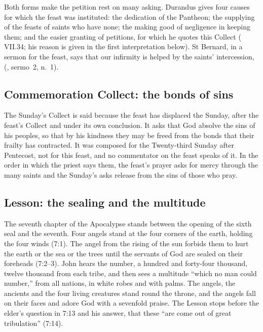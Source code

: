 Both forms make the petition rest on many asking. Durandus gives four causes
for which the feast was instituted: the dedication of the Pantheon; the
supplying of the feasts of saints who have none; the making good of
negligence in keeping them; and the easier granting of petitions, for which
he quotes this Collect ( VII.34; his reason is given in the
first interpretation below). St Bernard, in a sermon for the feast, says that our infirmity is helped by the saints'
intercession, 
(, sermo~2, n.~1).

\subsection{Commemoration Collect: the bonds of sins}
\label{sec:element-commemoration-collect}

The Sunday's Collect is said because the feast has displaced the Sunday, after
the feast's Collect and under its own conclusion. It asks that God absolve the
sins of his peoples, so that by his kindness they may be freed from the bonds
that their frailty has contracted. It was composed for the Twenty-third Sunday
after Pentecost, not for this feast, and no commentator on the feast speaks of
it. In the order in which the priest says them, the feast's prayer asks for
mercy through the many saints and the Sunday's asks release from the sins of
those who pray.

\subsection{Lesson: the sealing and the multitude}
\label{sec:element-lesson}

The seventh chapter of the Apocalypse stands between the opening of the sixth
seal and the seventh. Four angels stand at the four corners of the earth,
holding the four winds (7:1). The angel from the rising of the sun forbids
them to hurt the earth or the sea or the trees until the servants of God are
sealed on their foreheads (7:2--3). John hears the number, a hundred and
forty-four thousand, twelve thousand from each tribe, and then sees a
multitude ``which no man could number,'' from all nations, in white robes and
with palms. The angels, the ancients and the four living creatures stand round
the throne, and the angels fall on their faces and adore God with a sevenfold
praise. The Lesson stops before the elder's question in 7:13 and his answer,
that these ``are come out of great tribulation'' (7:14).

